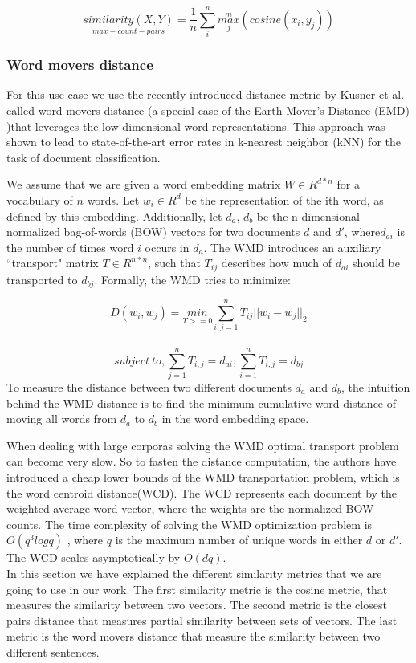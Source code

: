 \documentclass{article}
\begin{document}
$$\underset{max-count-pairs}{similarity(X,Y)}=\frac{1}{n}\sum_{i}^{n} \overset {m}{\underset{j}{max}}( cosine(x_{i},y_{j}))$$
\subsubsection{Word movers distance}

For this use case we use the recently introduced distance metric by  Kusner et al. \cite{wmd:2015} called word movers distance (a special case of the Earth Mover’s Distance (EMD) \cite{emd:1998})that leverages the low-dimensional word representations.
This approach was shown to lead to state-of-the-art error rates in k-nearest neighbor (kNN) for the task of document classification.

We assume that we are given a word embedding matrix $W \in R^{d*n}$ for a vocabulary of $n$ words. Let 
$w_{i} \in R^{d} $ be the representation of the ith word, as defined by this embedding. Additionally, let $d_{a}$, $d_{b}$ be the n-dimensional normalized bag-of-words (BOW) vectors for two documents $d$ and $d'$, where$ d_{ai} $ is the number of times word $i$ occurs in $d_{a}$. The WMD introduces an auxiliary ``transport" matrix $T \in R^{n*n}$, such that $T_{ij}$ describes how much of $d_{ai}$ should be transported to $d_{bj}$.
Formally, the WMD tries to minimize:

$$D(w_{i},w_{j})=\underset{T>=0}{ min} \sum_{i,j=1}^{n} T_{ij} || w_{i}-w_{j}||_{2} $$\\
$$subject \ to, \sum_{j=1}^{n} T_{i,j}=d_{ai}, \sum_{i=1}^{n} T_{i,j}=d_{bj}$$
To measure the distance between two different documents $d_{a}$ and $d_{b}$, the intuition behind the WMD distance is to find the minimum cumulative word distance of moving  all words from $d_{a}$ to $d_{b}$ in the word embedding space.

When dealing with large corporas solving the WMD optimal transport problem can become very slow. So to fasten the distance computation, the authors have introduced  a cheap lower bounds of the WMD transportation problem, which is the word centroid distance(WCD). The WCD represents each document by the weighted average word vector, where the weights are the normalized BOW counts.
The time complexity of solving the WMD optimization problem is $O(q^{3}log q)$ \cite{emdcomlexity:2009}, where $q$ is the maximum number of unique words in either $d$ or $d'$. The WCD scales asymptotically by $O(dq)$.
\\
In this section we have explained the different similarity metrics that we are going to use in our work. The first similarity metric is the cosine metric, that measures the similarity between two vectors. The second metric is the closest pairs distance that measures partial similarity between sets of vectors. The last metric is the word movers distance that measure the similarity between two different sentences.
\end{document}
